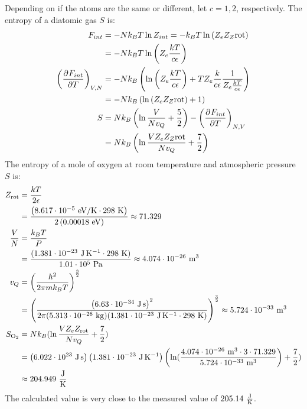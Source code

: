 \documentclass{article}
\begin{document}
\clearpage

Depending on if the atoms are the same or different, let $c = 1, 2$, respectively. The entropy of a diatomic gas $S$ is:
\begin{equation}
    \begin{split}
        F_{int} & = -Nk_BT\ln Z_{int} = -k_BT\ln \left(Z_eZ_Z{\text{rot}}\right) \\
        & = -Nk_BT\ln \left(Z_e\frac{kT}{c\epsilon}\right) \\
        {\left(\frac{\partial^{}F_{int}} {\partial T^{}}\right)}_{V,N} & = -Nk_B\left(\ln\left(Z_e\frac{kT}{c\epsilon}\right) + TZ_e\frac{k}{c\epsilon}\frac{1} {Z_e\frac{kT}{c\epsilon}}\right) \\
        & = -Nk_B\left(\ln \left(Z_eZ_Z{\text{rot}}\right) + 1\right) \\
        S & = Nk_B\left(\ln\frac{V}{Nv_Q} + \frac{5}{2}\right) - {\left(\frac{\partial^{}F_{int}} {\partial T^{}}\right)}_{N,V} \\
        & = Nk_B\left(\ln\frac{VZ_eZ_Z{\text{rot}}}{Nv_Q} + \frac{7}{2}\right)
    \end{split}
\end{equation}
The entropy of a mole of oxygen at room temperature and atmospheric pressure $S$ is:
\begin{equation}
    \begin{split}
        Z_{\text{rot}} & = \frac{kT}{2\epsilon} \\
        & = \frac{\left(8.617 \cdot 10^{-5}~\unit{eV\per\kelvin} \cdot 298~\unit{\kelvin}\right)}{2\left(0.00018~\unit{eV}\right)} \approx 71.329 \\
        \frac{V}{N} & = \frac{k_BT}{P} \\
        & = \frac{(1.381 \cdot 10^{-23}~\unit{\joule\per\kelvin} \cdot 298~\unit{\kelvin})}{1.01 \cdot 10^5~\unit{\pascal}} \approx 4.074 \cdot 10^{-26}~\unit{\meter\cubed} \\
        v_Q & = {\left(\frac{h^2}{2\pi mk_BT}\right)}^{\frac{3}{2}} \\
        & = {\left(\frac{{\left(6.63 \cdot 10^{-34}~\unit{\joule\second}\right)}^2}{2\pi (5.313 \cdot 10^{-26}~\unit{\kilogram})(1.381 \cdot 10^{-23}~\unit{\joule\per\kelvin} \cdot 298~\unit{\kelvin})}\right)}^{\frac{3}{2}} \approx 5.724 \cdot 10^{-33}~\unit{\meter\cubed} \\
        S_{\ce{O2}} & = Nk_B(\ln\frac{VZ_eZ_{\text{rot}}}{Nv_Q} + \frac{7}{2}) \\
        & = \left(6.022 \cdot 10^{23}~\unit{\joule\second}\right)\left(1.381 \cdot 10^{-23}~\unit{\joule\per\kelvin}\right)\left(\ln(\frac{4.074 \cdot 10^{-26}~\unit{\meter\cubed}\cdot 3 \cdot 71.329}{5.724 \cdot 10^{-33}~\unit{\meter\cubed}}\right) + \frac{7}{2}) \\
        & \approx 204.949~\unit{\frac{\joule}{\kelvin}}
    \end{split}
\end{equation}
The calculated value is very close to the measured value of $205.14~\unit{\frac{\joule}{\kelvin}}$.
\end{document}

